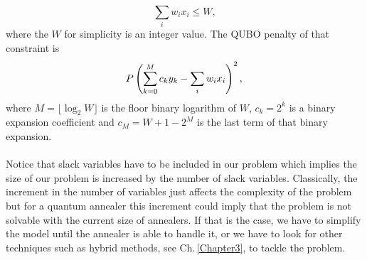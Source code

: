\begin{equation}
    \sum_{i}w_{i}x_{i}\leq W,
\end{equation}
where the $W$ for simplicity is an integer value. The QUBO penalty of that constraint is
\begin{equation}
    P \left(\sum_{k=0}^{M}c_{k}y_{k} - \sum_{i}w_{i}x_{i} \right)^{2}, \\
\end{equation}
where $M = \lfloor\log_{2}{W}\rfloor$ is the floor binary logarithm of $W$, $c_{k} = 2^{k}$ is a binary expansion coefficient and $c_{M} = W + 1 - 2^{M}$ is the last term of that binary expansion. \\\\
Notice that slack variables have to be included in our problem which implies the size of our problem is increased by the number of slack variables. Classically, the increment in the number of variables just affects the complexity of the problem but for a quantum annealer this increment could imply that the problem is not solvable with the current size of annealers. If that is the case, we have to simplify the model until the annealer is able to handle it, or we have to look for other techniques such as hybrid methods, see Ch.\,\ref{Chapter3}, to tackle the problem.

